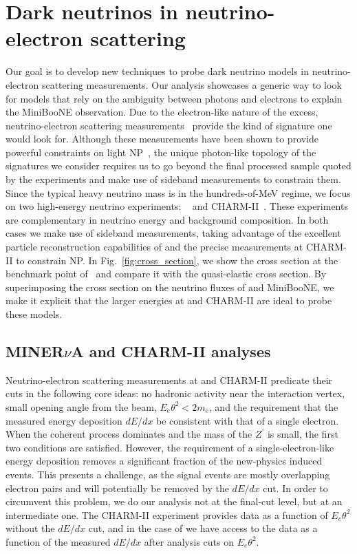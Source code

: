 \section{Dark neutrinos in neutrino-electron scattering}

Our goal is to develop new techniques to probe dark neutrino models in neutrino-electron scattering measurements. Our analysis showcases a generic way to look for models that rely on the ambiguity between photons and electrons to explain the MiniBooNE observation. Due to the electron-like nature of the excess, neutrino-electron scattering measurements~\cite{Auerbach:2001wg, Deniz:2009mu,Bellini:2011rx,Park:2013dax,Vilain:1994qy} provide the kind of signature one would look for. Although these measurements have been shown to provide powerful constraints on light NP~\cite{Pospelov:2017kep,Lindner:2018kjo,Magill:2018tbb}, the unique photon-like topology of the signatures we consider requires us to go beyond the final processed sample quoted by the experiments and make use of sideband measurements to constrain them.
Since the typical heavy neutrino mass is in the hundreds-of-MeV regime, we focus on two high-energy neutrino experiments: \minerva~\cite{Park:2013dax,Park:2015eqa,Valencia-Rodriguez:2016vkf} and CHARM-II~\cite{DeWinter:1989zg,Geiregat:1992zv,Vilain:1994qy}. These experiments are complementary in neutrino energy and background composition. In both cases we make use of sideband measurements, taking advantage of the excellent particle reconstruction capabilities of \minerva and the precise measurements at CHARM-II to constrain NP. In Fig.~\ref{fig:cross_section}, we show the cross section at the benchmark point of~\cite{Bertuzzo:2018ftf} and compare it with the quasi-elastic cross section. By superimposing the cross section on the neutrino fluxes of \minerva and MiniBooNE, we make it explicit that the larger energies at \minerva and CHARM-II are ideal to probe these models. 

\subsection{MINER$\nu$A and CHARM-II analyses}

Neutrino-electron scattering measurements at \minerva and CHARM-II predicate their cuts in the following core ideas: no hadronic activity near the interaction vertex, small opening angle from the beam, $E_e \theta^2 < 2 m_e$, and the requirement that the measured energy deposition $dE/dx$ be consistent with that of a single electron. When the coherent process dominates and the mass of the $Z^\prime$ is small, the first two conditions are satisfied. However, the requirement of a single-electron-like energy deposition removes a significant fraction of the new-physics induced events. This presents a challenge, as the signal events are mostly overlapping electron pairs and will potentially be removed by the $dE/dx$ cut.
In order to circumvent this problem, we do our analysis not at the final-cut level, but at an intermediate one. The CHARM-II experiment provides data as a function of $E_e \theta^2$ without the $dE/dx$ cut, and in the case of \minerva we have access to the data as a function of the measured $dE/dx$ after analysis cuts on $E_e \theta^2$.


